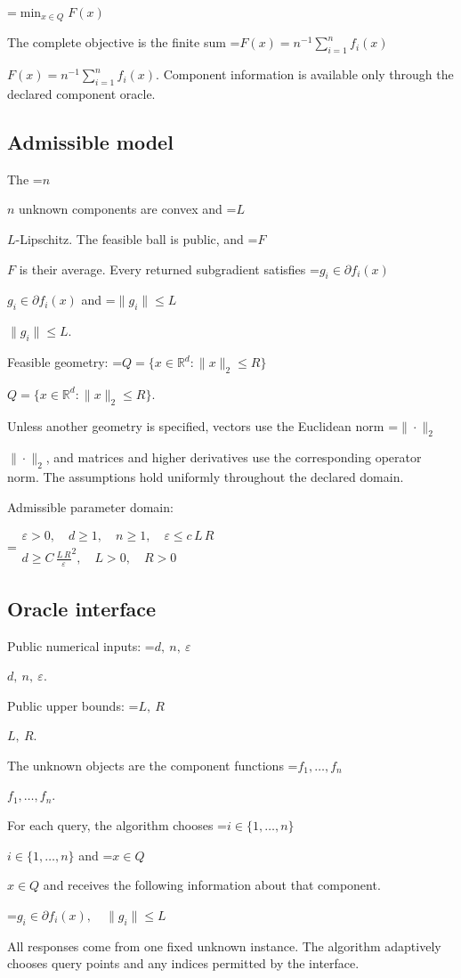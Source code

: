 \documentclass[10pt,a4paper]{article}
\newcommand{\AtlasMath}[1]{\par\begingroup\centering\setbox0=\hbox{$\displaystyle #1$}\ifdim\wd0>1.4\linewidth\typeout{ATLAS WIDE FORMULA: \the\wd0}\fi\ifdim\wd0>\linewidth\resizebox{\linewidth}{!}{\box0}\else\box0\fi\par\endgroup}
\newcommand{\AtlasInlineMath}[1]{\begingroup\setbox0=\hbox{$#1$}\ifdim\wd0>.4\linewidth\endgroup\AtlasMath{#1}\else\endgroup$#1$\fi}
\begin{document}
\AtlasMath{\min_{x\in Q}F(x)}


The complete objective is the finite sum \AtlasInlineMath{F(x)=n^{-1}\sum_{i=1}^n f_i(x)}. Component information is available only through the declared component oracle.

\subsection{Admissible model}
The \AtlasInlineMath{n} unknown components are convex and \AtlasInlineMath{L}-Lipschitz. The feasible ball is public, and \AtlasInlineMath{F} is their average. Every returned subgradient satisfies \AtlasInlineMath{g_i\in\partial f_i(x)} and \AtlasInlineMath{\|g_i\|\le L}.

Feasible geometry: \AtlasInlineMath{Q=\{x\in\mathbb{R}^d:\|x\|_2\le R\}}.

Unless another geometry is specified, vectors use the Euclidean norm \AtlasInlineMath{\|\cdot\|_2}, and matrices and higher derivatives use the corresponding operator norm. The assumptions hold uniformly throughout the declared domain.

Admissible parameter domain:


\AtlasMath{\begin{gathered}\varepsilon > 0,\quad d \ge 1,\quad n \ge 1,\quad \varepsilon \le c\,L\,R\\d \ge C\,{\frac{L\,R}{\varepsilon}}^{2},\quad L > 0,\quad R > 0\end{gathered}}


\subsection{Oracle interface}
Public numerical inputs: \AtlasInlineMath{d,\ n,\ \varepsilon}.

Public upper bounds: \AtlasInlineMath{L,\ R}.

The unknown objects are the component functions \AtlasInlineMath{f_1,\ldots,f_n}.

For each query, the algorithm chooses \AtlasInlineMath{i\in\{1,\ldots,n\}} and \AtlasInlineMath{x\in Q} and receives the following information about that component.


\AtlasMath{g_i\in\partial f_i(x),\quad\|g_i\|\le L}


All responses come from one fixed unknown instance. The algorithm adaptively chooses query points and any indices permitted by the interface.
\end{document}
